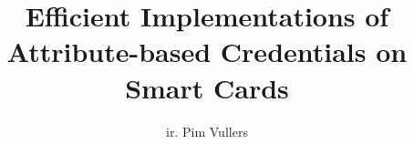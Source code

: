 \title{Efficient Implementations of\\ Attribute-based Credentials on Smart Cards}
\author{ir. Pim Vullers}

\maketitle